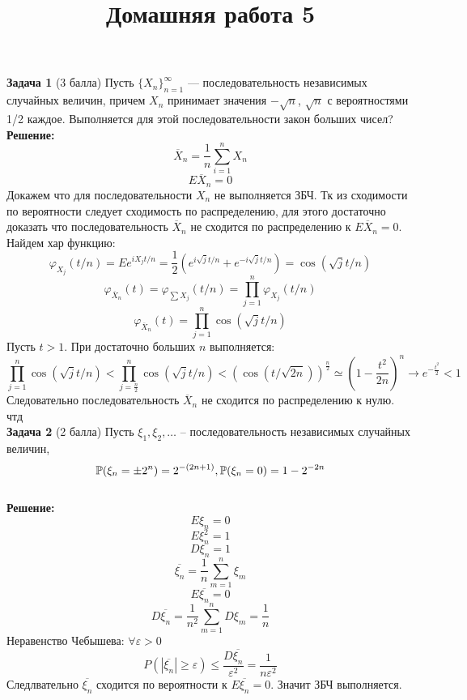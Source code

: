 \documentclass{article}
\title{Домашняя работа 5}
\begin{document}
\maketitle
\textbf{Задача 1} (3 балла)
 Пусть $\{X_n\}_{n=1}^{\infty}$ — последовательность независимых случайных величин, причем
$X_n$ принимает значения $- \sqrt{n}$, $\sqrt{n}$ с вероятностями 1/2 каждое. Выполняется для этой последовательности закон больших чисел?\\

\textbf{Решение:}\\
$$\overline{X}_n = \frac{1}{n}\sum\limits_{i=1}^{n}X_n$$
$$E\overline{X}_n = 0$$
Докажем что для последовательности $X_n$ не выполняется ЗБЧ. Тк из сходимости по вероятности следует сходимость по распределению, для этого достаточно доказать что последовательность $\overline{X}_n$ не сходится по распределению к $E\overline{X}_n = 0$.\\
Найдем хар функцию:\\
$$\varphi_{X_j}(t/n) = Ee^{iX_jt/n} = \frac{1}{2}(e^{i\sqrt{j}t/n}+e^{-i\sqrt{j}t/n}) = \cos(\sqrt{j}t/n)$$
$$\varphi_{\overline{X}_n}(t) = \varphi_{\sum X_j}(t/n) = \prod\limits_{j=1}^n \varphi_{X_j}(t/n)$$
$$\varphi_{\overline{X}_n}(t) = \prod\limits_{j=1}^n \cos(\sqrt{j}t/n)$$
Пусть $t>1$. При достаточно больших $n$ выполняется:
$$\prod\limits_{j=1}^n \cos(\sqrt{j}t/n) < \prod\limits_{j=\frac{n}{2}}^n \cos(\sqrt{j}t/n) < (\cos(t/\sqrt{2n}))^{\frac{n}{2}}\simeq (1 - \frac{t^2}{2n})^n \rightarrow e^{-\frac{t^2}{2}} < 1$$
Следовательно последовательность $\overline{X}_n$ не сходится по распределению к нулю.\\
чтд\\

\textbf{Задача 2} (2 балла)
Пусть $\xi_1, \xi_2, \dots$ -- последовательность независимых случайных величин,
$$\mathbb{P}(\xi_n = \pm2^n) = 2^{-(2n+1)}, \space \mathbb{P}(\xi_n = 0) = 1 - 2^{-2n}$$\\

\textbf{Решение:}\\
$$E\xi_n = 0$$
$$E\xi_n^2 = 1$$
$$D\xi_n = 1$$
$$\overline{\xi_n} = \frac{1}{n}\sum\limits_{m=1}^n \xi_m$$
$$E\overline{\xi_n} = 0$$
$$D\overline{\xi_n} = \frac{1}{n^2}\sum\limits_{m=1}^n D\xi_m = \frac{1}{n}$$
Неравенство Чебышева: $\forall\varepsilon>0$
$$P(|\overline{\xi_n}| \geq \varepsilon) \leq \frac{D\overline{\xi_n}}{\varepsilon^2} = \frac{1}{n\varepsilon^2}$$
Следлвательно $\overline{\xi_n}$ сходится по вероятности к $E\overline{\xi_n} = 0$. Значит ЗБЧ выполняется.\\
\end{document}
